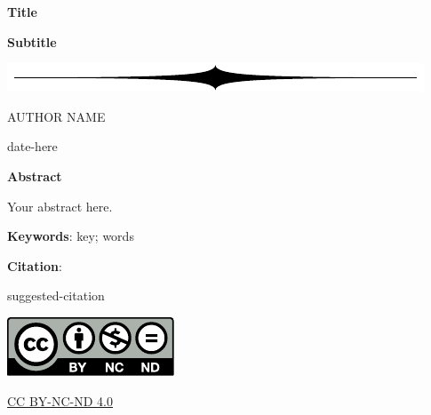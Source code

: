 \documentclass[12pt]{extarticle}
\begin{document}
\thispagestyle{empty}


\bigskip

{\selectfont
\color{titlecolor}
\centerline{\huge{\textbf{Title}}}
\bigskip
\centerline{\Large{\textbf{Subtitle}}}
}

\bigskip
\bigskip

\centerline{\includegraphics[scale=0.25]{divider}}

\bigskip
\bigskip

\centerline{ \large AUTHOR NAME\footnotemark}

\bigskip

\centerline{ date-here }


\bigskip
\bigskip

\noindent \textbf{Abstract}

Your abstract here.

\bigskip

\textbf{Keywords}: key; words

\bigskip

\textbf{Citation}:

suggested-citation

\bigskip
\bigskip

\begin{centering}
	
\vfill

\includegraphics[scale=0.5]{by-nc-nd} \vspace{-0.8em}

\footnotesize
\href{commons-link}{CC BY-NC-ND 4.0}

\vfill

\end{centering}
\end{document}
